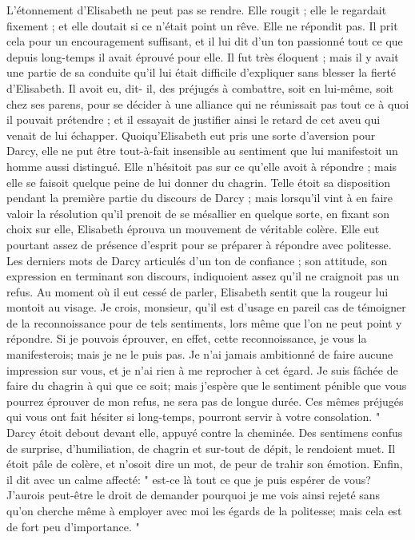 L'étonnement d'Elisabeth ne peut pas se rendre. Elle rougit ; elle le regardait fixement ; et elle doutait si ce n'était point un rêve. Elle ne répondit pas. Il prit cela pour un encouragement suffisant, et il lui dit d'un ton passionné tout ce que depuis long-temps il avait éprouvé pour elle. Il fut très éloquent ; mais il y avait une partie de sa conduite qu'il lui était difficile d'expliquer sans blesser la fierté d'Elisabeth. Il avoit eu, dit- il, des préjugés à combattre, soit en lui-même, soit chez ses parens, pour se décider à une alliance qui ne réunissait pas tout ce à quoi il pouvait prétendre ; et il essayait de justifier ainsi le retard de cet aveu qui venait de lui échapper.
Quoiqu'Elisabeth eut pris une sorte d'aversion pour Darcy, elle ne put être tout-à-fait insensible au sentiment que lui manifestoit\setcounter{page}{548} un homme aussi distingué. Elle n'hésitoit pas sur ce qu'elle avoit à répondre ; mais elle se faisoit quelque peine de lui donner du chagrin.
Telle étoit sa disposition pendant la première partie du discours de Darcy ; mais lorsqu'il vint à en faire valoir la résolution qu'il prenoit de se mésallier en quelque sorte, en fixant son choix sur elle, Elisabeth éprouva un mouvement de véritable colère. Elle eut pourtant assez de présence d'esprit pour se préparer à répondre avec politesse. Les derniers mots de Darcy articulés d'un ton de confiance ; son attitude, son expression en terminant son discours, indiquoient assez qu'il ne craignoit pas un refus.
Au moment où il eut cessé de parler, Elisabeth sentit que la rougeur lui montoit au visage.
Je crois, monsieur, qu'il est d'usage en pareil cas de témoigner de la reconnoissance pour de tels sentiments, lors même que l'on ne peut point y répondre. Si je pouvois éprouver, en effet, cette reconnoissance, je vous la manifesterois; mais je ne le puis pas. Je n'ai jamais ambitionné de faire aucune impression sur vous, et je n'ai rien à me reprocher à cet égard. Je suis fâchée de faire\setcounter{page}{549} du chagrin à qui que ce soit; mais j'espère que le sentiment pénible que vous pourrez éprouver de mon refus, ne sera pas de longue durée. Ces mêmes préjugés qui vous ont fait hésiter si long-temps, pourront servir à votre consolation. "
Darcy étoit debout devant elle, appuyé contre la cheminée. Des sentimens confus de surprise, d'humiliation, de chagrin et sur-tout de dépit, le rendoient muet. Il étoit pâle de colère, et n'osoit dire un mot, de peur de trahir son émotion. Enfin, il dit avec un calme affecté: " est-ce là tout ce que je puis espérer de vous? J'aurois peut-être le droit de demander pourquoi je me vois ainsi rejeté sans qu'on cherche même à employer avec moi les égards de la politesse; mais cela est de fort peu d'importance. "

